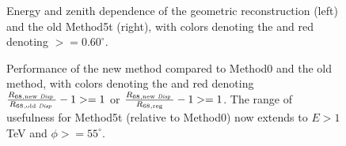 \documentclass[main.tex]{subfiles}
\begin{document}
\begin{figure}[htbp]
  \centering
  \caption[Energy and zenith dependence of Method0 and the old Method5t]{Energy and zenith dependence of the geometric reconstruction (left) and the old Method5t (right), with colors denoting the \rse and red denoting \rse$>=0.60^\circ$.}
  \label{fig:energy_contour}
\end{figure}

\begin{figure}[htbp]
  \centering
  \caption[Performance of the new \disp method compared to Method0 and the old \disp method]{Performance of the new \disp method compared to Method0 and the old \disp method, with colors denoting the \rse and red denoting $\frac{R_{68, \textrm{new \textit{Disp }}}}{R_{68, \textrm{old \textit{Disp }}}}-1>=1$ or  $\frac{R_{68, \textrm{new \textit{Disp }}}}{R_{68, \textrm{reg}}}-1>=1$. The range of usefulness for Method5t (relative to Method0) now extends to $E>1$TeV and $\phi>=55^\circ$.}
  \label{fig:energy_rel}
\end{figure}
\end{document}
